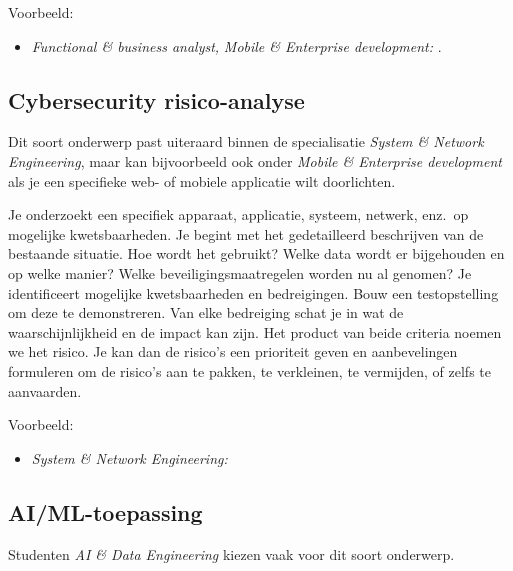 Voorbeeld:

\begin{itemize}
  \item \emph{Functional \& business analyst,} \emph{Mobile \& Enterprise development:}  \autocite{VanDerPlaetsen2013}.
\end{itemize}

\subsection{Cybersecurity risico-analyse}%
\label{ssec:onderwerp_types_cybersecurity_risico_analyse}

Dit soort onderwerp past uiteraard binnen de specialisatie \emph{System \& Network Engineering}, maar kan bijvoorbeeld ook onder \emph{Mobile \& Enterprise development} als je een specifieke web- of mobiele applicatie wilt doorlichten.

Je onderzoekt een specifiek apparaat, applicatie, systeem, netwerk, enz.\ op mogelijke kwetsbaarheden. Je begint met het gedetailleerd beschrijven van de bestaande situatie. Hoe wordt het gebruikt? Welke data wordt er bijgehouden en op welke manier? Welke beveiligingsmaatregelen worden nu al genomen? Je identificeert mogelijke kwetsbaarheden en bedreigingen. Bouw een testopstelling om deze te demonstreren. Van elke bedreiging schat je in wat de waarschijnlijkheid en de impact kan zijn. Het product van beide criteria noemen we het risico. Je kan dan de risico's een prioriteit geven en aanbevelingen formuleren om de risico's aan te pakken, te verkleinen, te vermijden, of zelfs te aanvaarden.

Voorbeeld:

\begin{itemize}
  \item \emph{System \& Network Engineering:}  \autocite{Vermeersch2024}
\end{itemize}

\subsection{AI/ML-toepassing}%
\label{ssec:onderwerp_types_ml_toepassing}

Studenten \emph{AI \& Data Engineering} kiezen vaak voor dit soort onderwerp.

